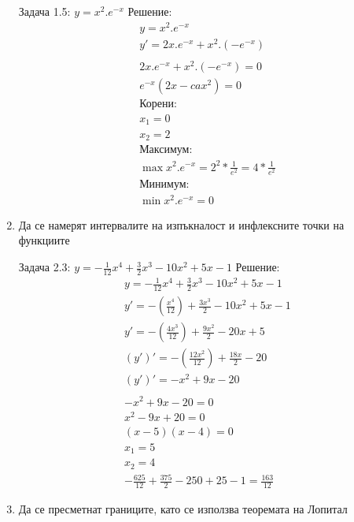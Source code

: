 \documentclass[a4paper, 20pt, fleqn, border=2pt]{article}
\begin{document}
\begin{enumerate}
Задача 1.5: $y = x^2.e^{-x}$
Решение:
\begin{equation}
\begin{split}
    y = x^2.e^{-x} \\
    y' = 2x.e^{-x} + x^2.(-e^{-x}) \\ 
    \\
    2x.e^{-x} + x^2.(-e^{-x}) = 0 \\
    e^{-x}(2x -ca x^2) = 0 \\
    \text{Корени: } \\
    x_{1} = 0 \\
    x_{2} = 2 \\
    \text{Максимум: } \\
    \max{x^2.e^{-x}} = 2^2 * \frac{1}{e^2} = 4 * \frac{1}{e^2} \\
    \text{Минимум: } \\
    \min{x^2.e^{-x}} = 0
\end{split}
\end{equation}


    \item Да се намерят интервалите на изпъкналост и инфлексните точки на функциите
\par
\par

Задача 2.3: $y = -\frac{1}{12}x^4 + \frac{3}{2}x^3 - 10x^2 + 5x - 1$
Решение:
\begin{equation}
\begin{split}
    y = -\frac{1}{12}x^4 + \frac{3}{2}x^3 - 10x^2 + 5x - 1 \\
    y' = -(\frac{x^4}{12}) + \frac{3x^3}{2} - 10x^2 + 5x - 1 \\
    y' = -(\frac{4x^3}{12}) + \frac{9x^2}{2} - 20x + 5 \\
    (y')' = -(\frac{12x^2}{12}) + \frac{18x}{2} - 20 \\
    (y')' = -x^2 + 9x - 20 \\
    \\
    -x^2 + 9x - 20 = 0 \\
    x^2 - 9x + 20 = 0 \\
    (x - 5)(x - 4) = 0 \\
    x_{1} = 5 \\
    x_{2} = 4 \\
    -\frac{625}{12} + \frac{375}{2} - 250 + 25 - 1 = \frac{163}{12}
\end{split}
\end{equation}


    \item Да се пресметнат границите, като се използва теоремата на Лопитал
\par
\par


\end{enumerate}
\end{document}
